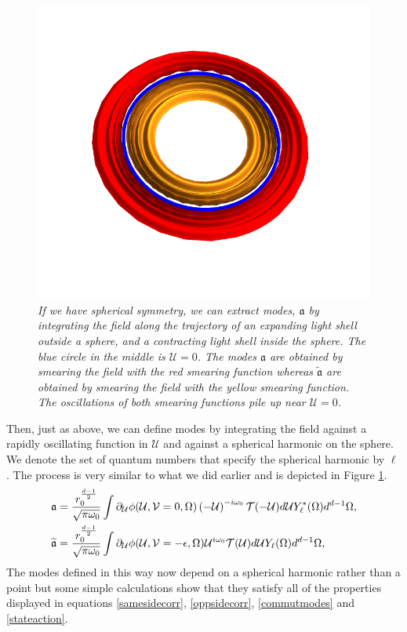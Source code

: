\documentclass[12pt]{article}
\newcommand{\be}{\begin{equation}}
\newcommand{\ee}{\end{equation}}
\def \anh {\mathfrak{a}}
\def \tildanh {\widetilde{\mathfrak{a}}}
\def\uent{\mathcal{U}}
\def\vent{\mathcal{V}}
\def\tune{{\cal T}}
\begin{document}
\begin{figure}[!ht]
\begin{center}
\includegraphics[height=0.4\textheight]{modeextractspherical.pdf}
\caption{\em If we have spherical symmetry, we can extract modes, $\anh$  by integrating the field along the trajectory of  an expanding light shell outside a sphere, and a contracting light shell inside the sphere. The blue circle in the middle is $\uent = 0$. The modes $\anh$ are obtained  by smearing the field with the red smearing function whereas $\tildanh$ are obtained by smearing the field with the yellow smearing function. The oscillations of both smearing functions pile up near $\uent = 0$. \label{figsphericalmode}}
\end{center}
\end{figure}
Then, just as above, we can define modes by integrating the field against a rapidly oscillating function in $\uent$ and against a spherical harmonic  on the sphere. We denote the set of quantum numbers that specify the spherical harmonic by $\ell$. The process is very similar to what we did earlier and is depicted in Figure \ref{figsphericalmode}.
\be
\label{sphericalmodedef}
\begin{split}
&\anh = {r_0^{{d-1 \over 2}}  \over  \sqrt{\pi \omega_0}  } \int\partial_{\uent} \phi(\uent, \vent=0, \Omega) \left(-\uent \right)^{-i \omega_0} \tune(-\uent) d \uent Y_{\ell}^*(\Omega) d^{d-1} \Omega, \\
&\tildanh = {r_0^{{d-1 \over 2}}  \over  \sqrt{\pi \omega_0}} \int \partial_\uent \phi(\uent,\vent=-\epsilon,\Omega) \uent^{i \omega_0} \tune(\uent) d \uent Y_{\ell}(\Omega) d^{d-1} \Omega,
\end{split}
\ee
The modes defined in this way now depend on a spherical harmonic rather than a point but some simple calculations show that they satisfy all of the properties displayed in equations \eqref{samesidecorr}, \eqref{oppsidecorr}, \eqref{commutmodes} and \eqref{stateaction}.
\end{document}
